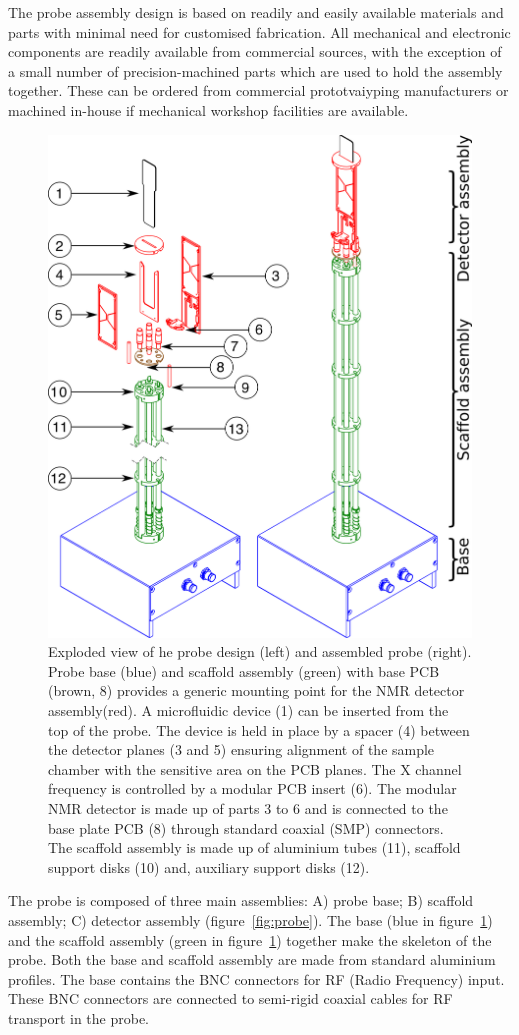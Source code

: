 \documentclass[preprint,12pt]{article}
\begin{document}
The probe assembly design is based on readily and easily available materials and parts 
with minimal need for customised fabrication.
All mechanical and electronic components are readily available from commercial sources, 
with the exception of a small number of precision-machined parts which are used 
to hold the assembly together. These can be ordered from commercial prototvaiyping 
manufacturers or machined in-house if mechanical workshop facilities are available.

\begin{figure}
\centering
\includegraphics[width=.5\linewidth,keepaspectratio=true]{./figures/ms5n17-tlp-im-181007-Probe-explode.png} 
\caption{Exploded view of he probe design (left) and assembled probe (right). 
Probe base (blue) and scaffold assembly (green) with base PCB (brown, 8) provides a 
generic mounting point for the NMR detector assembly(red). 
A microfluidic device (1) can be inserted from the top of the probe. 
The device is held in place by a spacer (4) between the detector planes (3 and 5) 
ensuring alignment of the sample chamber with the sensitive area on the PCB planes. 
The X channel frequency is controlled by a 
modular PCB insert (6). The modular NMR detector is made up of parts 3 to 6 and is 
connected to the base plate PCB (8) through standard coaxial (SMP) connectors. 
The scaffold assembly is made up of aluminium tubes (11), scaffold support disks (10) 
and, auxiliary support disks (12).}
\label{fig:probe-explode} 
\end{figure}

The probe is composed of three main assemblies: A) probe base; B) scaffold assembly; 
C) detector assembly (figure~\ref{fig:probe}). 
The  base (blue in figure~\ref{fig:probe-explode}) and the scaffold assembly 
(green in figure~\ref{fig:probe-explode}) together make the skeleton of the probe. 
Both the base and scaffold assembly are made from standard aluminium profiles. 
The base contains the BNC connectors for RF (Radio Frequency) input. 
These BNC connectors are connected to semi-rigid coaxial cables for 
RF transport in the probe.
\end{document}
